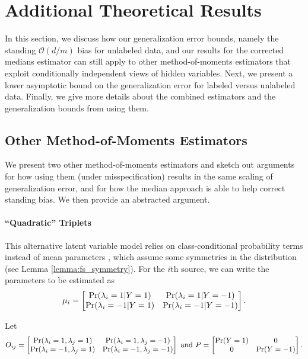 \section{Additional Theoretical Results}

In this section, we discuss how our generalization error bounds, namely the standing $\mathcal{O}(d/m)$ bias for unlabeled data, and our results for the corrected medians estimator can still apply to other method-of-moments estimators that exploit conditionally independent views of hidden variables. Next, we present a lower asymptotic bound on the generalization error for labeled versus unlabeled data. Finally, we give more details about the combined estimators and the generalization bounds from using them.

\subsection{Other Method-of-Moments Estimators}

We present two other method-of-moments estimators and sketch out arguments for how using them (under misspecification) results in the same scaling of generalization error, and for how the median approach is able to help correct standing bias. We then provide an abstracted argument. 

\paragraph{``Quadratic'' Triplets} 
This alternative latent variable model relies on class-conditional probability terms instead of mean parameters \citep{fu2020fast}, which assume some symmetries in the distribution (see Lemma \ref{lemma:fs_symmetry}). For the $i$th source, we can write the parameters to be estimated as
\[\mu_i =
  \begin{bmatrix}
    \Pr(\lambda_i = 1|Y = 1) & \Pr(\lambda_i = 1|Y = -1)  \\
    \Pr(\lambda_i = -1|Y = 1) & \Pr(\lambda_i = -1|Y = -1)
  \end{bmatrix}.\] 

Let
\[O_{ij} =
  \begin{bmatrix}
    \Pr(\lambda_i = 1, \lambda_j = 1) & \Pr(\lambda_i = 1,\lambda_j = -1)  \\
    \Pr(\lambda_i = -1,\lambda_j = 1) & \Pr(\lambda_i = -1,\lambda_j = -1)
  \end{bmatrix}
  \text{    and    }
  P =
  \begin{bmatrix}
    \Pr(Y=1) & 0  \\
    0 & \Pr(Y=-1)
  \end{bmatrix}.
  \]

